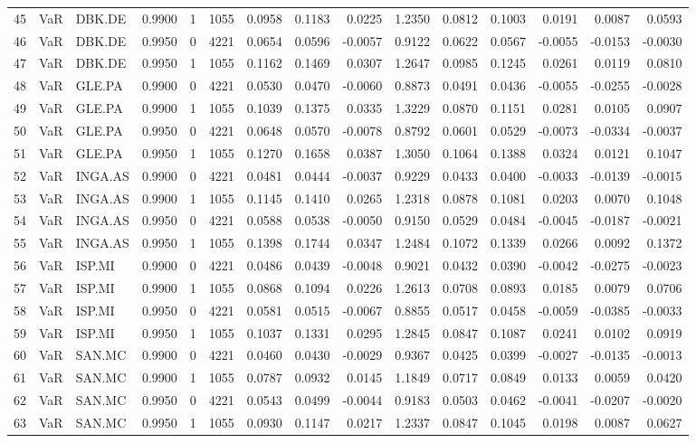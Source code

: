 \begin{table}
\begin{tabular}{lllrrrrrrrrrrrr}
45 & VaR & DBK.DE & 0.9900 & 1 & 1055 & 0.0958 & 0.1183 & 0.0225 & 1.2350 & 0.0812 & 0.1003 & 0.0191 & 0.0087 & 0.0593 \\
46 & VaR & DBK.DE & 0.9950 & 0 & 4221 & 0.0654 & 0.0596 & -0.0057 & 0.9122 & 0.0622 & 0.0567 & -0.0055 & -0.0153 & -0.0030 \\
47 & VaR & DBK.DE & 0.9950 & 1 & 1055 & 0.1162 & 0.1469 & 0.0307 & 1.2647 & 0.0985 & 0.1245 & 0.0261 & 0.0119 & 0.0810 \\
48 & VaR & GLE.PA & 0.9900 & 0 & 4221 & 0.0530 & 0.0470 & -0.0060 & 0.8873 & 0.0491 & 0.0436 & -0.0055 & -0.0255 & -0.0028 \\
49 & VaR & GLE.PA & 0.9900 & 1 & 1055 & 0.1039 & 0.1375 & 0.0335 & 1.3229 & 0.0870 & 0.1151 & 0.0281 & 0.0105 & 0.0907 \\
50 & VaR & GLE.PA & 0.9950 & 0 & 4221 & 0.0648 & 0.0570 & -0.0078 & 0.8792 & 0.0601 & 0.0529 & -0.0073 & -0.0334 & -0.0037 \\
51 & VaR & GLE.PA & 0.9950 & 1 & 1055 & 0.1270 & 0.1658 & 0.0387 & 1.3050 & 0.1064 & 0.1388 & 0.0324 & 0.0121 & 0.1047 \\
52 & VaR & INGA.AS & 0.9900 & 0 & 4221 & 0.0481 & 0.0444 & -0.0037 & 0.9229 & 0.0433 & 0.0400 & -0.0033 & -0.0139 & -0.0015 \\
53 & VaR & INGA.AS & 0.9900 & 1 & 1055 & 0.1145 & 0.1410 & 0.0265 & 1.2318 & 0.0878 & 0.1081 & 0.0203 & 0.0070 & 0.1048 \\
54 & VaR & INGA.AS & 0.9950 & 0 & 4221 & 0.0588 & 0.0538 & -0.0050 & 0.9150 & 0.0529 & 0.0484 & -0.0045 & -0.0187 & -0.0021 \\
55 & VaR & INGA.AS & 0.9950 & 1 & 1055 & 0.1398 & 0.1744 & 0.0347 & 1.2484 & 0.1072 & 0.1339 & 0.0266 & 0.0092 & 0.1372 \\
56 & VaR & ISP.MI & 0.9900 & 0 & 4221 & 0.0486 & 0.0439 & -0.0048 & 0.9021 & 0.0432 & 0.0390 & -0.0042 & -0.0275 & -0.0023 \\
57 & VaR & ISP.MI & 0.9900 & 1 & 1055 & 0.0868 & 0.1094 & 0.0226 & 1.2613 & 0.0708 & 0.0893 & 0.0185 & 0.0079 & 0.0706 \\
58 & VaR & ISP.MI & 0.9950 & 0 & 4221 & 0.0581 & 0.0515 & -0.0067 & 0.8855 & 0.0517 & 0.0458 & -0.0059 & -0.0385 & -0.0033 \\
59 & VaR & ISP.MI & 0.9950 & 1 & 1055 & 0.1037 & 0.1331 & 0.0295 & 1.2845 & 0.0847 & 0.1087 & 0.0241 & 0.0102 & 0.0919 \\
60 & VaR & SAN.MC & 0.9900 & 0 & 4221 & 0.0460 & 0.0430 & -0.0029 & 0.9367 & 0.0425 & 0.0399 & -0.0027 & -0.0135 & -0.0013 \\
61 & VaR & SAN.MC & 0.9900 & 1 & 1055 & 0.0787 & 0.0932 & 0.0145 & 1.1849 & 0.0717 & 0.0849 & 0.0133 & 0.0059 & 0.0420 \\
62 & VaR & SAN.MC & 0.9950 & 0 & 4221 & 0.0543 & 0.0499 & -0.0044 & 0.9183 & 0.0503 & 0.0462 & -0.0041 & -0.0207 & -0.0020 \\
63 & VaR & SAN.MC & 0.9950 & 1 & 1055 & 0.0930 & 0.1147 & 0.0217 & 1.2337 & 0.0847 & 0.1045 & 0.0198 & 0.0087 & 0.0627 \\
\bottomrule
\end{tabular}
\end{table}
